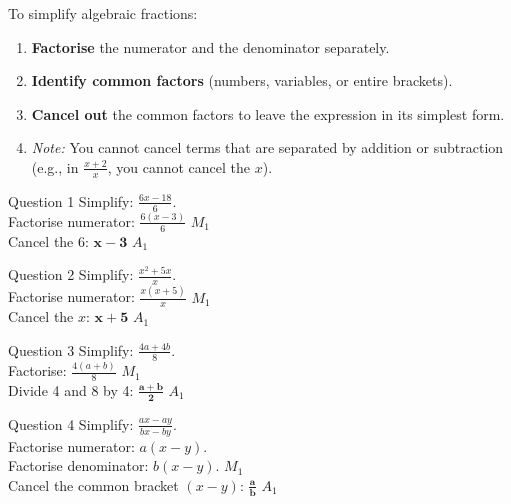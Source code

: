 \documentclass[12pt, a4paper, oneside]{article}
\begin{document}
\begin{tcolorbox}[colback=lightgrey, colframe=primaryblue, title=\textbf{Technique: Divide and Conquer}, arc=5pt]
    To simplify algebraic fractions:
    \begin{enumerate}
        \item \textbf{Factorise} the numerator and the denominator separately.
        \item \textbf{Identify common factors} (numbers, variables, or entire brackets).
        \item \textbf{Cancel out} the common factors to leave the expression in its simplest form.
        \item \textit{Note:} You cannot cancel terms that are separated by addition or subtraction (e.g., in $\frac{x+2}{x}$, you cannot cancel the $x$).
    \end{enumerate}
\end{tcolorbox}

\begin{solvingbox}{Question 1}
Simplify: $\frac{6x - 18}{6}$. \\
Factorise numerator: $\frac{6(x - 3)}{6}$ \hfill $M_1$ \\
Cancel the 6: $\mathbf{x - 3}$ \hfill $A_1$
\end{solvingbox}

\begin{solvingbox}{Question 2}
Simplify: $\frac{x^2 + 5x}{x}$. \\
Factorise numerator: $\frac{x(x + 5)}{x}$ \hfill $M_1$ \\
Cancel the $x$: $\mathbf{x + 5}$ \hfill $A_1$
\end{solvingbox}

\begin{solvingbox}{Question 3}
Simplify: $\frac{4a + 4b}{8}$. \\
Factorise: $\frac{4(a + b)}{8}$ \hfill $M_1$ \\
Divide 4 and 8 by 4: $\mathbf{\frac{a + b}{2}}$ \hfill $A_1$
\end{solvingbox}

\begin{solvingbox}{Question 4}
Simplify: $\frac{ax - ay}{bx - by}$. \\
Factorise numerator: $a(x - y)$. \\
Factorise denominator: $b(x - y)$. \hfill $M_1$ \\
Cancel the common bracket $(x - y)$: $\mathbf{\frac{a}{b}}$ \hfill $A_1$
\end{solvingbox}
\end{document}
